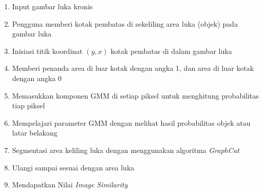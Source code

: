 \begin{enumerate}
    \item{Input gambar luka kronis}
    \item{Pengguna memberi kotak pembatas di sekeliling area luka (objek) pada gambar luka}
    \item{Inisiasi titik koordinat \((y,x)\) kotak pembatas di dalam gambar luka}
    \item{Memberi penanda area di luar kotak dengan angka 1, dan area di luar kotak
    dengan angka 0}
    \item{Memasukkan komponen GMM di setiap piksel untuk menghitung probabilitas 
    tiap piksel }
    \item{Mempelajari parameter GMM dengan melihat hasil probabilitas objek atau latar belakang}
    \item{Segmentasi area keliling luka dengan menggunakan algoritma \emph{GraphCut}}
    \item{Ulangi sampai sesuai dengan area luka}
    \item{Mendapatkan Nilai \emph{Image Similarity}}
  \end{enumerate}